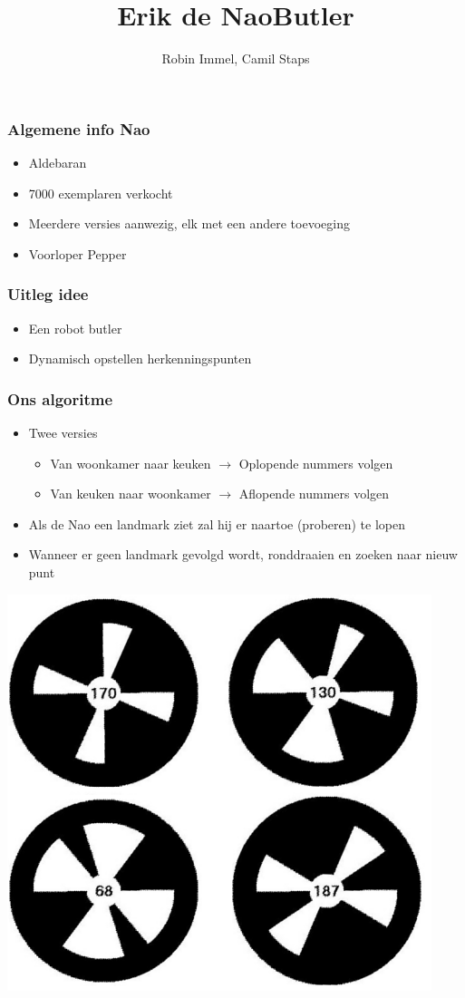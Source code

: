 \documentclass[]{beamerruhuisstijl}
\title{Erik de NaoButler}
\author{Robin Immel, Camil Staps}
\begin{document}
\frame{\titlepage}

\begin{frame}
  \frametitle{Algemene info Nao}
  \begin{itemize}
    \item Aldebaran
    \item 7000 exemplaren verkocht
    \item Meerdere versies aanwezig, elk met een andere toevoeging
    \item Voorloper Pepper  
  \end{itemize}
\end{frame}

\begin{frame}
  \frametitle{Uitleg idee}
  \begin{itemize}
    \item Een robot butler
    \item Dynamisch opstellen herkenningspunten
  \end{itemize}
\end{frame}

\begin{frame}
  \frametitle{Ons algoritme}
  \begin{itemize}
    \item Twee versies
      \begin{itemize}
        \item Van woonkamer naar keuken $\to$ Oplopende nummers volgen
        \item Van keuken naar woonkamer $\to$ Aflopende nummers volgen
      \end{itemize}
    \item Als de Nao een landmark ziet zal hij er naartoe (proberen) te lopen
    \item Wanneer er geen landmark gevolgd wordt, ronddraaien en zoeken naar nieuw punt 
  \end{itemize}

  \begin{center}
    \includegraphics[width=.25\linewidth]{naomark}
  \end{center}
\end{frame}
\end{document}
